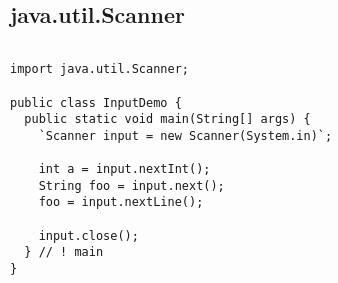 \documentclass[en, 11pt, xcolor=dvipsnames]{beamer}
\begin{document}
\subsection{java.util.Scanner}
\begin{frame}[fragile]


	\begin{columns}[c]
		\begin{column}{0.9\textwidth}

			\begin{lstlisting}[style=Java]
import java.util.Scanner;

public class InputDemo {
  public static void main(String[] args) {
    `Scanner input = new Scanner(System.in)`;

    int a = input.nextInt();
    String foo = input.next();
    foo = input.nextLine();

    input.close();
  } // ! main
}\end{lstlisting}

		\end{column}
	\end{columns}

\end{frame}

\end{document}
